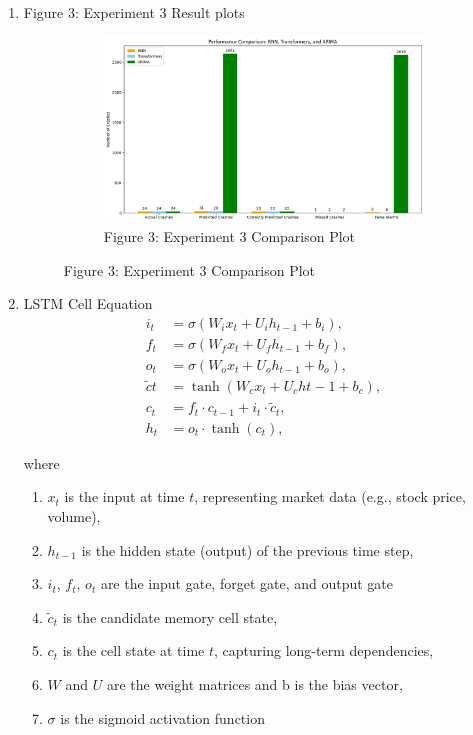 \documentclass[12pt, letterpaper]{article}
\begin{document}
\begin{enumerate}
    \item Figure 3: Experiment 3 Result plots 
    \begin{figure}[H]
        \centering
        \begin{subfigure}[b]{0.9\textwidth}
            \centering
            \includegraphics[width=\textwidth]{exp3_figure.png}
            \caption{Figure 3: Experiment 3 Comparison Plot}
        \end{subfigure}
        \hfill
    \end{figure}

    \item LSTM Cell Equation
    \begin{align*} 
        i_t &= \sigma(W_i x_t + U_i h_{t-1} + b_i), \\ f_t &= \sigma(W_f x_t + U_f h_{t-1} + b_f), \\ o_t &= \sigma(W_o x_t + U_o h_{t-1} + b_o), \\ \tilde{c}t &= \tanh(W_c x_t + U_c h{t-1} + b_c), \\ c_t &= f_t \cdot c_{t-1} + i_t \cdot \tilde{c}_t, \\ h_t &= o_t \cdot \tanh(c_t), 
    \end{align*}
    
    where
    
    \begin{enumerate}[label=-]
        \item $x_t$ is the input at time $t$, representing market data (e.g., stock price, volume),
        \item $h_{t-1}$ is the hidden state (output) of the previous time step,
        \item $i_t$, $f_t$, $o_t$ are the input gate, forget gate, and output gate
        \item $\tilde{c}_t$ is the candidate memory cell state,
        \item $c_t$ is the cell state at time $t$, capturing long-term dependencies,
        \item $W$ and $U$ are the weight matrices and b is the bias vector,
        \item $\sigma$ is the sigmoid activation function
    \end{enumerate}


\end{enumerate}
\end{document}
